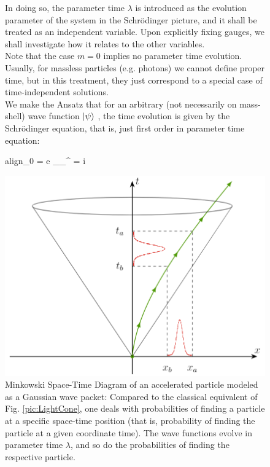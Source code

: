 \documentclass[twoside,a4paper,11pt]{article}
\numberwithin{equation}{section}
\newcommand{\boxedeq}[2]{\begin{empheq}[box={\fboxsep=6pt\fbox}]{align}\label{#1}#2\end{empheq}}
\begin{document}
\begin{figure}[H]
  \centering
  \begin{minipage}[H]{0.44\textwidth}
    \justify
In doing so, the parameter time $\lambda$ is introduced as the evolution parameter of the system in the Schr{\"o}dinger picture, and it shall be treated as an independent variable. Upon explicitly fixing gauges, we shall investigate how it relates to the other variables.\\

Note that the case $m=0$ implies no parameter time evolution. Usually, for massless particles (e.g. photons) we cannot define proper time, but in this treatment, they just correspond to a special case of time-independent solutions. \\

We make the Ansatz that for an arbitrary (not necessarily on mass-shell) wave function $\ket{\psi}$ , the time evolution is given by the Schr{\"o}dinger equation, that is, just first order in parameter time equation:

\boxedeq{eq:timeevolution}{_0 \ket{\psi} = e _\mu \hat{p}_\nu \eta^{\mu\nu} \ket{\psi}=   i \dfrac{\partial \ket{\psi}}{\partial \lambda}}



  \end{minipage}
  \hfill
  \begin{minipage}[H]{0.54\textwidth}
    \centering
    \includegraphics[width=1.0\textwidth]{Pics/LightCones_PosDisl.PNG}
    \caption{Minkowski Space-Time Diagram of an accelerated particle modeled as a Gaussian wave packet: Compared to the classical equivalent of Fig. \ref{pic:LightCone}, one deals with probabilities of finding a particle at a specific space-time position (that is, probability of finding the particle at a given coordinate time). The wave functions evolve in parameter time $\lambda$, and so do the probabilities of finding the respective particle.}
    \label{pic:posdistribution}
\end{minipage}
\end{figure}
\end{document}
